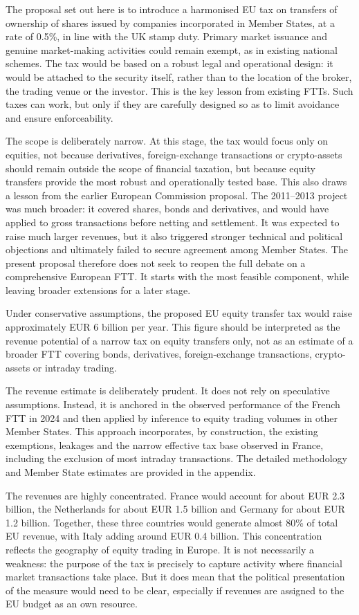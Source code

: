 \documentclass[../../main]{subfiles}
\begin{document}
The proposal set out here is to introduce a harmonised EU tax on transfers of ownership of shares issued by companies incorporated in Member States, at a rate of 0.5\%, in line with the UK stamp duty. Primary market issuance and genuine market-making activities could remain exempt, as in existing national schemes. The tax would be based on a robust legal and operational design: it would be attached to the security itself, rather than to the location of the broker, the trading venue or the investor. This is the key lesson from existing FTTs. Such taxes can work, but only if they are carefully designed so as to limit avoidance and ensure enforceability.

The scope is deliberately narrow. At this stage, the tax would focus only on equities, not because derivatives, foreign-exchange transactions or crypto-assets should remain outside the scope of financial taxation, but because equity transfers provide the most robust and operationally tested base. This also draws a lesson from the earlier European Commission proposal. The 2011--2013 project was much broader: it covered shares, bonds and derivatives, and would have applied to gross transactions before netting and settlement. It was expected to raise much larger revenues, but it also triggered stronger technical and political objections and ultimately failed to secure agreement among Member States. The present proposal therefore does not seek to reopen the full debate on a comprehensive European FTT. It starts with the most feasible component, while leaving broader extensions for a later stage.

Under conservative assumptions, the proposed EU equity transfer tax would raise approximately EUR 6 billion per year. This figure should be interpreted as the revenue potential of a narrow tax on equity transfers only, not as an estimate of a broader FTT covering bonds, derivatives, foreign-exchange transactions, crypto-assets or intraday trading.

The revenue estimate is deliberately prudent. It does not rely on speculative assumptions. Instead, it is anchored in the observed performance of the French FTT in 2024 and then applied by inference to equity trading volumes in other Member States. This approach incorporates, by construction, the existing exemptions, leakages and the narrow effective tax base observed in France, including the exclusion of most intraday transactions. The detailed methodology and Member State estimates are provided in the appendix.

The revenues are highly concentrated. France would account for about EUR 2.3 billion, the Netherlands for about EUR 1.5 billion and Germany for about EUR 1.2 billion. Together, these three countries would generate almost 80\% of total EU revenue, with Italy adding around EUR 0.4 billion. This concentration reflects the geography of equity trading in Europe. It is not necessarily a weakness: the purpose of the tax is precisely to capture activity where financial market transactions take place. But it does mean that the political presentation of the measure would need to be clear, especially if revenues are assigned to the EU budget as an own resource.
\end{document}

